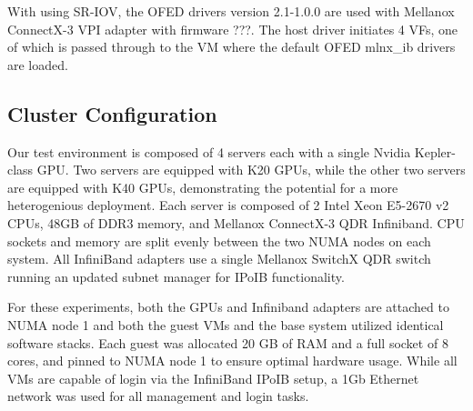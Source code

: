 \documentclass[times,10pt,twocolumn,conference]{IEEEtran}
\begin{document}
With using SR-IOV, the OFED drivers version 2.1-1.0.0 are used with Mellanox ConnectX-3 VPI adapter with firmware ???.  The host driver initiates 4 VFs, one of which is passed through to the VM where the default OFED mlnx\_ib drivers are loaded.  




\subsection{Cluster Configuration}

Our test environment is composed of 4 servers each with a single Nvidia Kepler-class GPU.  Two servers are equipped with K20 GPUs, while the other two servers are equipped with K40 GPUs, demonstrating the potential for a more heterogenious deployment.  Each server is composed of 2 Intel Xeon E5-2670 v2 CPUs, 48GB of DDR3 memory, and Mellanox ConnectX-3 QDR Infiniband.  CPU sockets and memory are split evenly between the two NUMA nodes on each system. All InfiniBand adapters use a single Mellanox SwitchX QDR switch running an updated subnet manager for IPoIB functionality.   


For these experiments, both the GPUs and Infiniband adapters are attached to NUMA node 1 and both the guest VMs and the base system utilized identical software stacks.  Each guest was allocated 20 GB of RAM and a full socket of 8 cores, and pinned to NUMA node 1 to ensure optimal hardware usage. While all VMs are capable of login via the InfiniBand IPoIB setup, a 1Gb Ethernet network was used for all management and login tasks.  

\end{document}
